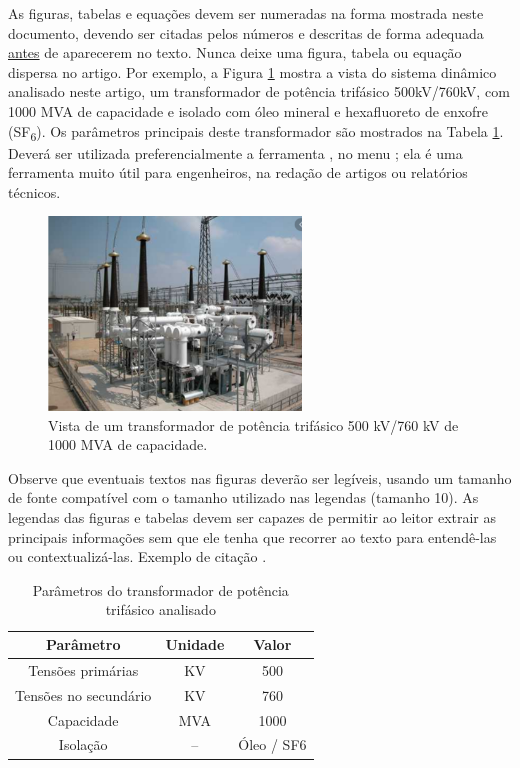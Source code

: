 As figuras, tabelas e equações devem ser numeradas na forma mostrada neste documento, devendo ser citadas pelos números e descritas de forma adequada \underline{antes} de aparecerem no texto.
Nunca deixe uma figura, tabela ou equação dispersa no artigo.
Por exemplo, a Figura \ref{fig:tras-trifasico} mostra a vista do sistema dinâmico analisado neste artigo, um transformador de potência trifásico 500kV/760kV, com 1000 MVA de capacidade e isolado com óleo mineral e hexafluoreto de enxofre (SF\textsubscript{6}).
Os parâmetros principais deste transformador são mostrados na Tabela \ref{tab:dados}.
Deverá ser utilizada preferencialmente a ferramenta , no menu ; ela é uma ferramenta muito útil para engenheiros, na redação de artigos ou relatórios técnicos.

\begin{figure}[htb]
    \centering
    \includegraphics[width=0.6\textwidth]{images/transformador_trifasico.png}
    \caption{Vista de um transformador de potência trifásico 500 kV/760 kV de 1000 MVA de capacidade.}
    \label{fig:tras-trifasico}
\end{figure}

Observe que eventuais textos nas figuras deverão ser legíveis, usando um tamanho de fonte compatível com o tamanho utilizado nas legendas (tamanho 10).
As legendas das figuras e tabelas devem ser capazes de permitir ao leitor extrair as principais informações sem que ele tenha que recorrer ao texto para entendê-las ou contextualizá-las.
Exemplo de citação \cite{lathi2006sinais}.

\begin{table}[htb]
    \footnotesize
    \centering
    \caption{Parâmetros do transformador de potência trifásico analisado}
    \label{tab:dados}
    \begin{tabular}{ccc}
        \hline
        \textbf{Parâmetro}    & \textbf{Unidade} & \textbf{Valor} \\ \hline
        Tensões primárias     & KV               & 500            \\
        Tensões no secundário & KV               & 760            \\
        Capacidade            & MVA              & 1000           \\
        Isolação              & --               & Óleo / SF6     \\ \hline
    \end{tabular}
\end{table}

